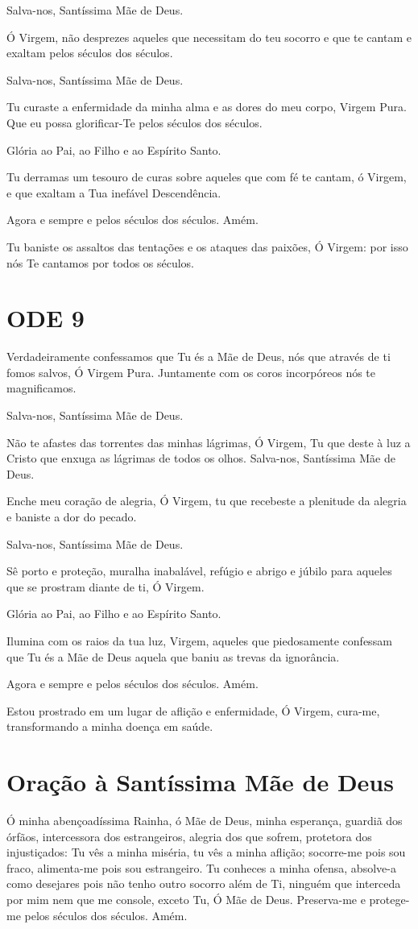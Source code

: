 \documentclass{subfiles}
\begin{document}
Salva-nos, Santíssima Mãe de Deus.

Ó Virgem, não desprezes aqueles que necessitam do teu socorro e que
te cantam e exaltam pelos séculos dos séculos.

Salva-nos, Santíssima Mãe de Deus.

Tu curaste a enfermidade da minha alma e as dores do meu corpo,
Virgem Pura. Que eu possa glorificar-Te pelos séculos dos séculos.

Glória ao Pai, ao Filho e ao Espírito Santo.

Tu derramas um tesouro de curas sobre aqueles que com fé te cantam,
ó Virgem, e que exaltam a Tua inefável Descendência.

Agora e sempre e pelos séculos dos séculos. Amém.

Tu baniste os assaltos das tentações e os ataques das paixões, Ó Virgem: por
isso nós Te cantamos por todos os séculos.

\section{ODE 9}

\eirmos{}Verdadeiramente confessamos que Tu és a Mãe de Deus, nós
que através de ti fomos salvos, Ó Virgem Pura. Juntamente com os coros
incorpóreos nós te magnificamos.

Salva-nos, Santíssima Mãe de Deus.

Não te afastes das torrentes das minhas lágrimas, Ó Virgem, Tu que
deste à luz a Cristo que enxuga as lágrimas de todos os olhos.
Salva-nos, Santíssima Mãe de Deus.

Enche meu coração de alegria, Ó Virgem, tu que recebeste a plenitude
da alegria e baniste a dor do pecado.

Salva-nos, Santíssima Mãe de Deus.

Sê porto e proteção, muralha inabalável, refúgio e abrigo e júbilo para
aqueles que se prostram diante de ti, Ó Virgem.

Glória ao Pai, ao Filho e ao Espírito Santo.

Ilumina com os raios da tua luz, Virgem, aqueles que piedosamente
confessam que Tu és a Mãe de Deus aquela que baniu as trevas da ignorância.

Agora e sempre e pelos séculos dos séculos. Amém.

Estou prostrado em um lugar de aflição e enfermidade, Ó Virgem, cura-me,
transformando a minha doença em saúde.

\section{Oração à Santíssima Mãe de Deus}

Ó minha abençoadíssima Rainha, ó Mãe de Deus, minha esperança, guardiã dos
órfãos, intercessora dos estrangeiros, alegria dos que sofrem, protetora dos
injustiçados: Tu vês a minha miséria, tu vês a minha aflição; socorre-me pois
sou fraco, alimenta-me pois sou estrangeiro. Tu conheces a minha ofensa,
absolve-a como desejares pois não tenho outro socorro além de Ti, ninguém que
interceda por mim nem que me console, exceto Tu, Ó Mãe de Deus. Preserva-me e
protege-me pelos séculos dos séculos. Amém.
\end{document}

